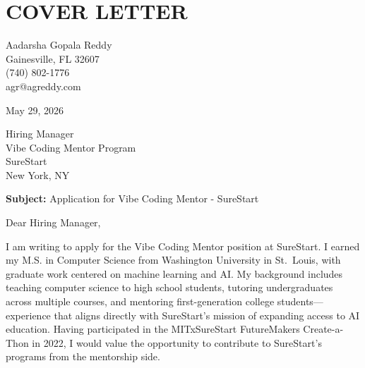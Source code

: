 \documentclass[10pt, letterpaper]{article}
\begin{document}
\vspace{\headerSpacing}
\section*{COVER LETTER}

\vspace{\headerSpacing}
\begin{onecolentry}
	Aadarsha Gopala Reddy\\
	Gainesville, FL 32607\\
	(740) 802-1776\\
	agr@agreddy.com\\
\end{onecolentry}

\vspace{\headerSpacing}
\begin{onecolentry}
	May 29, 2026\\
\end{onecolentry}

\vspace{\headerSpacing}
\begin{onecolentry}
	Hiring Manager\\
	Vibe Coding Mentor Program\\
	SureStart\\
	New York, NY\\
\end{onecolentry}

\vspace{\headerSpacing}
\begin{onecolentry}
	\textbf{Subject:} Application for Vibe Coding Mentor - SureStart
\end{onecolentry}

\vspace{\headerSpacing}
\begin{onecolentry}
	Dear Hiring Manager,
\end{onecolentry}

\vspace{\headerSpacing}
\begin{onecolentry}
	I am writing to apply for the Vibe Coding Mentor position at SureStart. I earned my M.S. in Computer Science from Washington University in St.~Louis, with graduate work centered on machine learning and AI. My background includes teaching computer science to high school students, tutoring undergraduates across multiple courses, and mentoring first-generation college students---experience that aligns directly with SureStart's mission of expanding access to AI education. Having participated in the MITxSureStart FutureMakers Create-a-Thon in 2022, I would value the opportunity to contribute to SureStart's programs from the mentorship side.
\end{onecolentry}
\end{document}
